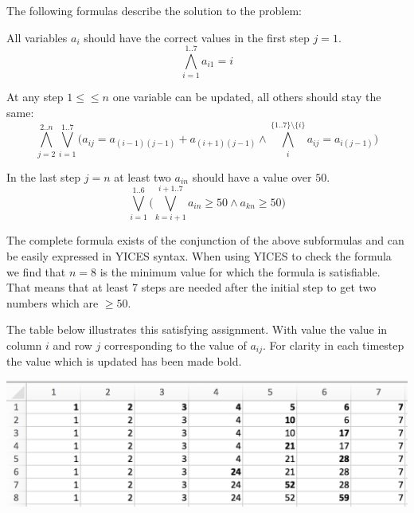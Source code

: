 \documentclass[12pt]{article}
\begin{document}
The following formulas describe the solution to the problem:

\vspace{3mm}

All variables $a_i$ should have the correct values in the first step $j=1$.
\begin{equation}
	\bigwedge_{i=1}^{1..7} a_{i1} = i
\end{equation}

\vspace{3mm}

At any step $1 \le \leq n$ one variable can be updated, all others should stay
the same:
\begin{equation}
	\bigwedge_{j=2}^{2..n} \bigvee_{i=1}^{1..7} 
		\Big(a_{ij} = a_{(i-1)(j-1)} + a_{(i+1)(j-1)} \wedge
		\bigwedge_i^{\{1..7\}\setminus \{i\}} a_{ij} = a_{i(j-1)} \Big)
\end{equation}

In the last step $j=n$ at least two $a_{in}$ should have a value over $50$. 
\begin{equation}
	\bigvee_{i=1}^{1..6} \Big( \bigvee_{k=i+1}^{i+1..7} 
		a_{in} \geq 50 \wedge a_{kn} \geq 50 \Big)
\end{equation}

The complete formula exists of the conjunction of the above subformulas and can 
be easily expressed in YICES syntax. When using YICES to check the formula
we find that $n=8$ is the minimum value for which the formula is satisfiable.
That means that at least 7 steps are needed after the initial step to get two
numbers which are $\geq 50$.

The table below illustrates this satisfying assignment. With value the value in
column $i$ and row $j$ corresponding to the value of $a_{ij}$. For clarity in
each timestep the value which is updated has been made bold.

\vspace{3mm}

\includegraphics[width=\textwidth]{four.png}
\end{document}
